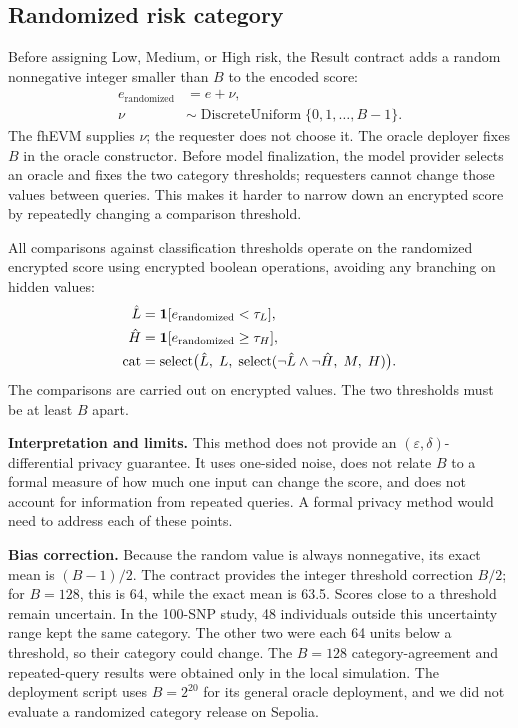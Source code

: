 \documentclass[10pt]{article}
\begin{document}
\subsection{Randomized risk category}

Before assigning Low, Medium, or High risk, the Result contract adds a random
nonnegative integer smaller than $B$ to the encoded score:
\begin{equation}
\begin{aligned}
e_{\mathrm{randomized}} &= e + \nu,\\
\nu &\sim \operatorname{DiscreteUniform}\{0,1,\ldots,B-1\}.
\end{aligned}
\end{equation}
The fhEVM supplies $\nu$; the requester does not choose it.  The oracle deployer fixes
$B$ in the oracle constructor.  Before model finalization, the model provider selects an
oracle and fixes the two category thresholds; requesters cannot change those values between
queries.  This makes it harder to narrow down an encrypted score by repeatedly changing a
comparison threshold.

All comparisons against classification thresholds operate on the randomized encrypted
score using encrypted boolean operations, avoiding any branching on hidden values:
\begin{align}
\hat{L} &= \mathbf{1}[e_{\mathrm{randomized}} < \tau_L], \notag\\
\hat{H} &= \mathbf{1}[e_{\mathrm{randomized}} \geq \tau_H], \notag\\
\mathrm{cat} &= \mathrm{select}\bigl(\hat{L},\;L,\;\mathrm{select}(\neg\hat{L}\wedge\neg\hat{H},\;M,\;H)\bigr).
\label{eq:classify}
\end{align}
The comparisons are carried out on encrypted values.  The two thresholds must be at
least $B$ apart.

\textbf{Interpretation and limits.}
This method does not provide an $(\varepsilon,\delta)$-differential privacy guarantee.
It uses one-sided noise, does not relate $B$ to a formal measure of how much one input
can change the score, and does not account for information from repeated queries.  A
formal privacy method would need to address each of these points.

\textbf{Bias correction.}
Because the random value is always nonnegative, its exact mean is $(B-1)/2$.  The
contract provides the integer threshold correction $B/2$; for $B=128$, this is 64,
while the exact mean is 63.5.  Scores close to a threshold remain uncertain.  In the
100-SNP study, 48 individuals outside this uncertainty range kept the same category.
The other two were each 64 units below a threshold, so their category could change.
The $B=128$ category-agreement and repeated-query results were obtained only in the local
simulation.  The deployment script uses $B=2^{20}$ for its general oracle deployment, and
we did not evaluate a randomized category release on Sepolia.
\end{document}

